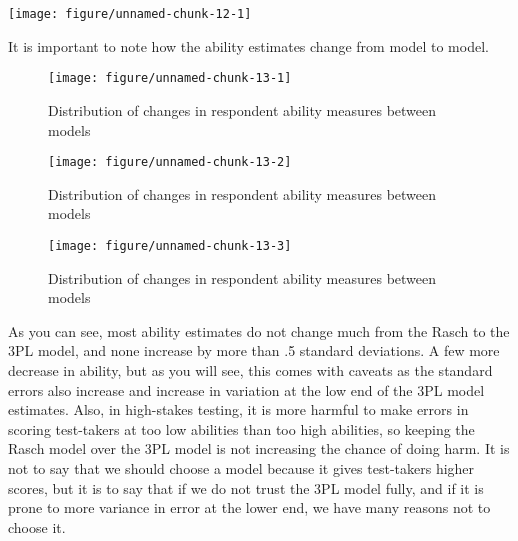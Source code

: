 \documentclass{article}\usepackage[]{graphicx}\usepackage[]{color}
\makeatletter
\newenvironment{kframe}{%
 \def\at@end@of@kframe{}%
 \ifinner\ifhmode%
  \def\at@end@of@kframe{\end{minipage}}%
  \begin{minipage}{\columnwidth}%
 \fi\fi%
 \def\FrameCommand##1{\hskip\@totalleftmargin \hskip-\fboxsep
 \colorbox{shadecolor}{##1}\hskip-\fboxsep
     \hskip-\linewidth \hskip-\@totalleftmargin \hskip\columnwidth}%
 \MakeFramed {\advance\hsize-\width
   \@totalleftmargin\z@ \linewidth\hsize
   \@setminipage}}%
 {\par\unskip\endMakeFramed%
 \at@end@of@kframe}
\newenvironment{knitrout}{}{} %
\makeatother
\begin{document}
\begin{enumerate}
\begin{knitrout}
{\centering \texttt{[image: figure/unnamed-chunk-12-1]} 

}



\end{knitrout}
\raggedright
It is important to note how the ability estimates change from model to model.

\centering
\begin{knitrout}
\color{fgcolor}\begin{kframe}


{\ttfamily\noindent\itshape\color{messagecolor}{\#\# EM cycles terminated after 500 iterations.}}\end{kframe}\begin{figure}[H]

{\centering \texttt{[image: figure/unnamed-chunk-13-1]} 

}

\caption[Distribution of changes in respondent ability measures between models]{Distribution of changes in respondent ability measures between models}\label{fig:unnamed-chunk-131}
\end{figure}

\begin{figure}[H]

{\centering \texttt{[image: figure/unnamed-chunk-13-2]} 

}

\caption[Distribution of changes in respondent ability measures between models]{Distribution of changes in respondent ability measures between models}\label{fig:unnamed-chunk-132}
\end{figure}

\begin{figure}[H]

{\centering \texttt{[image: figure/unnamed-chunk-13-3]} 

}

\caption[Distribution of changes in respondent ability measures between models]{Distribution of changes in respondent ability measures between models}\label{fig:unnamed-chunk-133}
\end{figure}


\end{knitrout}
\raggedright
As you can see, most ability estimates do not change much from the Rasch to the 3PL model, and none increase by more than .5 standard deviations. A few more decrease in ability, but as you will see, this comes with caveats as the standard errors also increase and increase in variation at the low end of the 3PL model estimates. Also, in high-stakes testing, it is more harmful to make errors in scoring test-takers at too low abilities than too high abilities, so keeping the Rasch model over the 3PL model is not increasing the chance of doing harm. It is not to say that we should choose a model because it gives test-takers higher scores, but it is to say that if we do not trust the 3PL model fully, and if it is prone to more variance in error at the lower end, we have many reasons not to choose it.
\raggedright


\end{enumerate}
\end{document}
